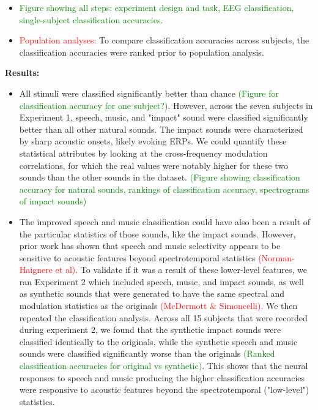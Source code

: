 \documentclass[11pt]{article}
\begin{document}
\begin{itemize}
\item \textcolor{green}{Figure showing all steps: experiment design and task, EEG classification, single-subject classification accuracies.}
\item \textcolor{red}{Population analyses:} To compare classification accuracies across subjects, the classification accuracies were ranked prior to population analysis.
\end{itemize}

\textbf{Results:}

\begin{itemize}
\item All stimuli were classified significantly better than chance \textcolor{green}{(Figure for classification accuracy for one subject?)}.  However, across the seven subjects in Experiment 1, speech, music, and "impact" sound were classified significantly better than all other natural sounds.  The impact sounds were characterized by sharp acoustic onsets, likely evoking ERPs.  We could quantify these statistical attributes by looking at the cross-frequency modulation correlations, for which the real values were notably higher for these two sounds than the other sounds in the dataset. \textcolor{green}{(Figure showing classification accuracy for natural sounds, rankings of classification accuracy, spectrograms of impact sounds)}
\item The improved speech and music classification could have also been a result of the particular statistics of those sounds, like the impact sounds.  However, prior work has shown that speech and music selectivity appears to be sensitive to acoustic features beyond spectrotemporal statistics \textcolor{red}{(Norman-Haignere et al)}.  To validate if it was a result of these lower-level features, we ran Experiment 2 which included speech, music, and impact sounds, as well as synthetic sounds that were generated to have the same spectral and modulation statistics as the originals \textcolor{red}{(McDermott \& Simoncelli)}.  We then repeated the classification analysis.  Across all 15 subjects that were recorded during experiment 2, we found that the synthetic impact sounds were classified identically to the originals, while the synthetic speech and music sounds were classified significantly worse than the originals \textcolor{green}{(Ranked classification accuracies for original vs synthetic)}.  This shows that the neural responses to speech and music producing the higher classification accuracies were responsive to acoustic features beyond the spectrotemporal ("low-level") statistics.

\end{itemize}
\end{document}
